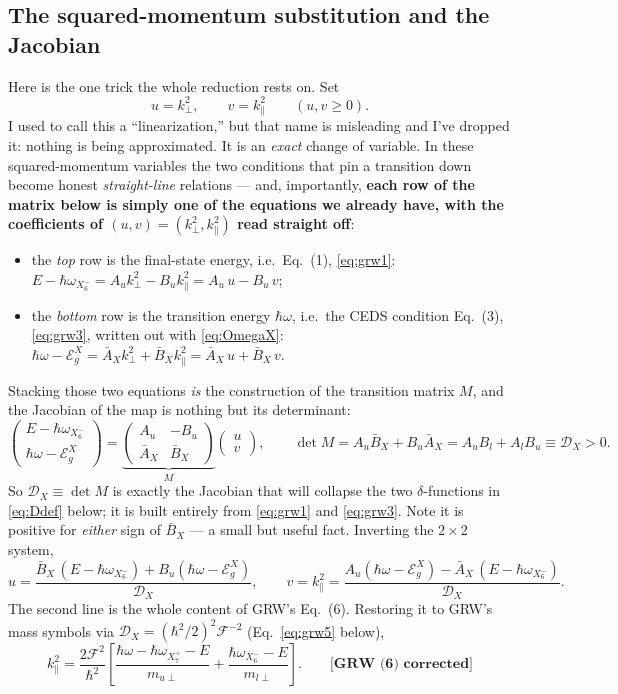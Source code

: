 \documentclass[11pt,a4paper]{article}
\numberwithin{equation}{section}
\newcommand{\hw}{\hbar\omega}
\newcommand{\EgX}{\mathcal{E}_g^{X}}
\newcommand{\cD}{\mathcal{D}}
\newcommand{\cF}{\mathcal{F}}
\newcommand{\AX}{\bar{A}_X}
\newcommand{\BX}{\bar{B}_X}
\newcommand{\kperp}{k_{\perp}}
\newcommand{\kpar}{k_{\parallel}}
\newcommand{\wXsix}{\hbar\omega_{X_6^-}}
\newcommand{\wXseven}{\hbar\omega_{X_7^+}}
\newcommand{\grwfix}[1]{\textbf{[GRW~(#1) corrected]}}
\begin{document}
\subsection{The squared-momentum substitution and the Jacobian}
\label{sec:Xsub}

Here is the one trick the whole reduction rests on. Set
\[
u=\kperp^2,\qquad v=\kpar^2 \qquad(u,v\ge0).
\]
I used to call this a ``linearization,'' but that name is misleading
and I've dropped it: nothing is being approximated. It is an
\emph{exact} change of variable. In these squared-momentum variables
the two conditions that pin a transition down become honest
\emph{straight-line} relations --- and, importantly, \textbf{each row
of the matrix below is simply one of the equations we already have,
with the coefficients of $(u,v)=(\kperp^2,\kpar^2)$ read straight
off}:
\begin{itemize}
\item the \emph{top} row is the final-state energy, i.e.\ Eq.~(1),
\eqref{eq:grw1}: $E-\wXsix=A_u\kperp^2-B_u\kpar^2=A_u\,u-B_u\,v$;
\item the \emph{bottom} row is the transition energy $\hw$, i.e.\ the
CEDS condition Eq.~(3), \eqref{eq:grw3}, written out with
\eqref{eq:OmegaX}: $\hw-\EgX=\AX\kperp^2+\BX\kpar^2=\AX\,u+\BX\,v$.
\end{itemize}
Stacking those two equations \emph{is} the construction of the
transition matrix $M$, and the Jacobian of the map is nothing but its
determinant:
\begin{equation}
\begin{pmatrix} E-\wXsix\\[2pt] \hw-\EgX\end{pmatrix}
=\underbrace{\begin{pmatrix} A_u & -B_u\\[2pt] \AX & \BX\end{pmatrix}}_{M}
\begin{pmatrix} u\\ v\end{pmatrix},
\qquad
\det M=A_u\BX+B_u\AX=A_uB_l+A_lB_u\equiv\cD_X>0 .
\label{eq:linX}
\end{equation}
So $\cD_X\equiv\det M$ is exactly the Jacobian that will collapse the
two $\delta$-functions in \eqref{eq:Ddef} below; it is built entirely
from \eqref{eq:grw1} and \eqref{eq:grw3}. Note it is positive for
\emph{either} sign of $\BX$ --- a small but useful fact. Inverting the
$2\times2$ system,
\begin{equation}
u=\frac{\BX\,(E-\wXsix)+B_u(\hw-\EgX)}{\cD_X},
\qquad
v=\kpar^2=\frac{A_u(\hw-\EgX)-\AX\,(E-\wXsix)}{\cD_X}.
\label{eq:uvX}
\end{equation}
The second line is the whole content of GRW's Eq.~(6). Restoring it to
GRW's mass symbols via $\cD_X=(\hbar^2/2)^2\cF^{-2}$
(Eq.~\eqref{eq:grw5} below),
\begin{equation}
\kpar^{2}
=\frac{2\cF^{2}}{\hbar^{2}}\left[
\frac{\hw-\wXseven-E}{m_{u\perp}}
+\frac{\wXsix-E}{m_{l\perp}}\right].
\qquad\grwfix{6}
\label{eq:grw6}
\end{equation}
\end{document}
